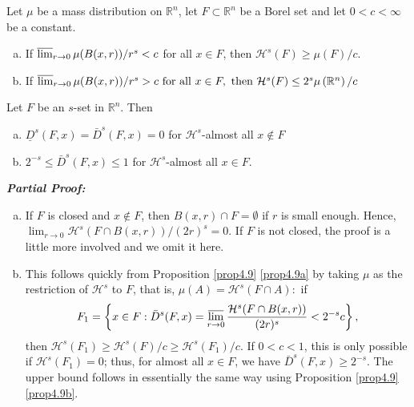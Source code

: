 \begin{proposition}\label{prop4.9}
    Let $\mu$ be a mass distribution on $\mathbb{R}^{n}$, let $F \subset \mathbb{R}^{n}$ be a Borel set and let $0<c<\infty$ be a constant.
    \begin{enumerate}[a.]
        \item\label{prop4.9a}  If $\varlimsup_{r \rightarrow 0} \mu(B(x, r)) / r^{s}<c$ for all $x \in F$, then $\mathcal{H}^{s}(F) \geq \mu(F) / c$.
        \item\label{prop4.9b} If $\operatorname*{\overline{lim}}_{r \rightarrow 0} \mu(B(x, r)) / r^{s}>c \text { for all } x \in F, \text { then } \mathcal{H}^{s}(F) \leq 2^{s} \mu\left(\mathbb{R}^{n}\right) / c$
    \end{enumerate}
\end{proposition}

\begin{proposition}\label{prop5.1}
    Let $F$ be an $s$-set in $\mathbb{R}^{n}$. Then
    \begin{enumerate}[a.]
        \item $\underline{D}^{s}(F, x)=\bar{D}^{s}(F, x)=0$ for $\mathcal{H}^{s}$-almost all $x \notin F$
        \item $2^{-s} \leq \bar{D}^{s}(F, x) \leq 1$ for $\mathcal{H}^{s}$-almost all $x \in F$.
    \end{enumerate}
\end{proposition}
\textbf{\textit{Partial Proof: }}\begin{enumerate}[a.]
    \item If $F$ is closed and $x \notin F$, then $B(x, r) \cap F=\emptyset$ if $r$ is small enough. Hence, $\lim _{r \rightarrow 0} \mathcal{H}^{s}(F \cap B(x, r)) /(2 r)^{s}=0$. If $F$ is not closed, the proof is a little more involved and we omit it here.
    \item This follows quickly from Proposition \ref{prop4.9} \ref{prop4.9a} by taking $\mu$ as the restriction of $\mathcal{H}^{s}$ to $F$, that is, $\mu(A)=\mathcal{H}^{s}(F \cap A):$ if
    $$
    F_{1}=\left\{x \in F: \bar{D}^{s}(F, x)=\varlimsup_{r \rightarrow 0} \frac{\mathcal{H}^{s}(F \cap B(x, r))}{(2 r)^{s}}<2^{-s} c\right\},
    $$
    then $\mathcal{H}^{s}\left(F_{1}\right) \geq \mathcal{H}^{s}(F) / c \geq \mathcal{H}^{s}\left(F_{1}\right) / c$. If $0<c<1$, this is only
    possible if $\mathcal{H}^{s}\left(F_{1}\right)=0$; thus, for almost all $x \in F$, we have $\bar{D}^{s}(F, x) \geq 2^{-s}$. The upper bound follows in essentially the same way using Proposition \ref{prop4.9} \ref{prop4.9b}.
\end{enumerate}

